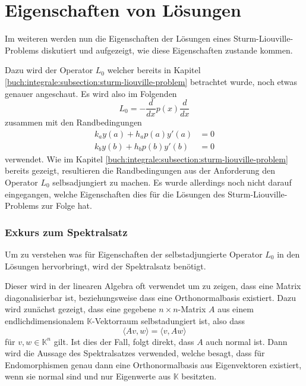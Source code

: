 %
%
%
\section{Eigenschaften von Lösungen
\label{sturmliouville:section:solution-properties}}

Im weiteren werden nun die Eigenschaften der Lösungen eines
Sturm-Liouville-Problems diskutiert und aufgezeigt, wie diese Eigenschaften
zustande kommen.

Dazu wird der Operator $L_0$ welcher bereits in Kapitel
\ref{buch:integrale:subsection:sturm-liouville-problem} betrachtet wurde,
noch etwas genauer angeschaut. Es wird also im Folgenden
\[
    L_0
    =
    -\frac{d}{dx}p(x)\frac{d}{dx}
\]
zusammen mit den Randbedingungen
\[
    \begin{aligned}
        k_a y(a) + h_a p(a) y'(a) &= 0 \\
        k_b y(b) + h_b p(b) y'(b) &= 0
    \end{aligned}
\]
verwendet. Wie im Kapitel
\ref{buch:integrale:subsection:sturm-liouville-problem} bereits gezeigt,
resultieren die Randbedingungen aus der Anforderung den Operator $L_0$
selbsadjungiert zu machen.
Es wurde allerdings noch nicht darauf eingegangen, welche Eigenschaften dies
für die Lösungen des Sturm-Liouville-Problems zur Folge hat.

\subsubsection{Exkurs zum Spektralsatz}

Um zu verstehen was für Eigenschaften der selbstadjungierte Operator $L_0$ in 
den Lösungen hervorbringt, wird der Spektralsatz benötigt.

Dieser wird in der linearen Algebra oft verwendet um zu zeigen, dass eine Matrix
diagonalisierbar ist, beziehungsweise dass eine Orthonormalbasis existiert.
Dazu wird zunächst gezeigt, dass eine gegebene $n\times n$-Matrix $A$ aus einem
endlichdimensionalem $\mathbb{K}$-Vektorraum selbstadungiert ist, also dass
\[
    \langle Av, w \rangle
    =
    \langle v, Aw \rangle
\]
für $ v, w \in \mathbb{K}^n$ gilt.
Ist dies der Fall, folgt direkt, dass $A$ auch normal ist.
Dann wird die Aussage des Spektralsatzes
\cite{sturmliouville:spektralsatz-wiki} verwended, welche besagt, dass für
Endomorphismen genau dann eine Orthonormalbasis aus Eigenvektoren existiert,
wenn sie normal sind und nur Eigenwerte aus $\mathbb{K}$ besitzten.

